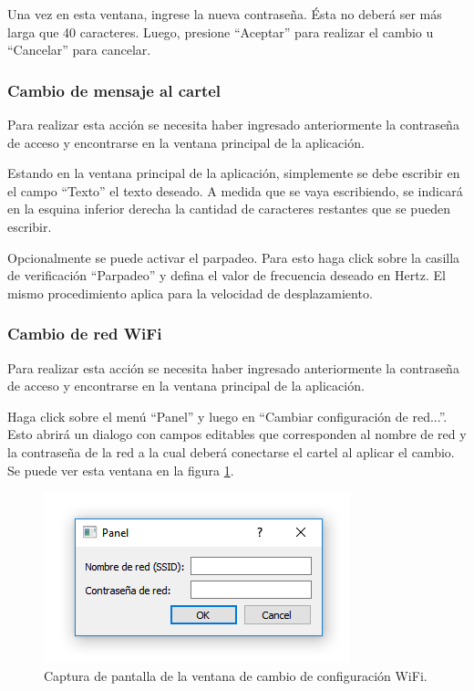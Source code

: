 Una vez en esta ventana, ingrese la nueva contraseña. Ésta no deberá ser más larga que 40 caracteres.
Luego, presione \enquote{Aceptar} para realizar el cambio u \enquote{Cancelar} para cancelar.

\subsubsection{Cambio de mensaje al cartel}\label{sec:guia-texto}
Para realizar esta acción se necesita haber ingresado anteriormente la contraseña de acceso y encontrarse en la ventana principal de la aplicación.

Estando en la ventana principal de la aplicación, simplemente se debe escribir en el campo \enquote{Texto} el texto deseado. A medida que se vaya escribiendo, se indicará en la esquina inferior derecha la cantidad de caracteres restantes que se pueden escribir.

Opcionalmente se puede activar el parpadeo. Para esto haga click sobre la casilla de verificación \enquote{Parpadeo} y defina el valor de frecuencia deseado en Hertz. El mismo procedimiento aplica para la velocidad de desplazamiento.

\subsubsection{Cambio de red WiFi}\label{sec:guia-wifi}
Para realizar esta acción se necesita haber ingresado anteriormente la contraseña de acceso y encontrarse en la ventana principal de la aplicación.

Haga click sobre el menú \enquote{Panel} y luego en \enquote{Cambiar configuración de red...}. Esto abrirá un dialogo con campos editables que corresponden al nombre de red y la contraseña de la red a la cual deberá conectarse el cartel al aplicar el cambio. Se puede ver esta ventana en la figura \ref{fig:scr-wifi}.

\begin{figure}[ht]
	\centering
	\includegraphics[scale=0.8]{imagenes/scr-wifi.png}
	\caption{Captura de pantalla de la ventana de cambio de configuración WiFi.}
	\label{fig:scr-wifi}
\end{figure}

